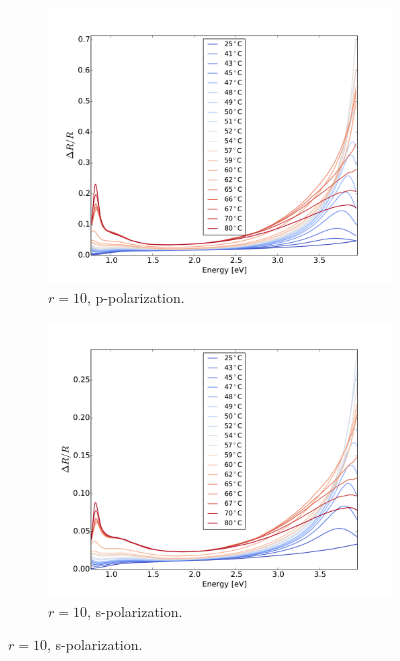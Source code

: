 \begin{figure}[h!]
    \centering
    \begin{subfigure}[b]{0.49\textwidth}
        \centering
        \includegraphics[width=\textwidth]{Results/Sim1/dR.pdf}
        \caption{$r = 10$, p-polarization.}
        \label{fig:dR10p}
    \end{subfigure}
    \begin{subfigure}[b]{0.49\textwidth}
        \centering
        \includegraphics[width=\textwidth]{Results/Sim2/dR.pdf}
        \caption{$r = 10$, s-polarization.}
        \label{fig:dR10s}
    \end{subfigure}

\end{figure}
